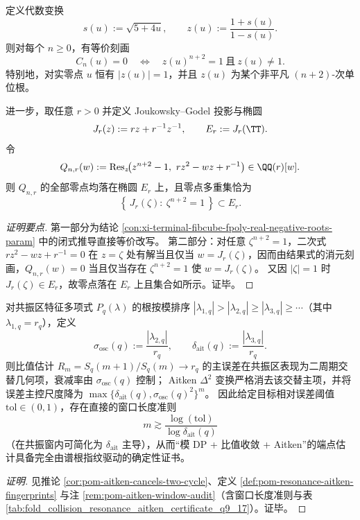 \begin{conclusion}\label{con:xi-terminal-fibcube-fpoly-circle-lift-jg-transport}
定义代数变换
\[
s(u):=\sqrt{5+4u},\qquad
z(u):=\frac{1+s(u)}{1-s(u)}.
\]
则对每个 \(n\ge 0\)，有等价刻画
\[
C_n(u)=0
\quad\Longleftrightarrow\quad
z(u)^{n+2}=1\ \text{且}\ z(u)\neq 1.
\]
特别地，对实零点 \(u\) 恒有 \(|z(u)|=1\)，并且 \(z(u)\) 为某个非平凡 \((n+2)\)-次单位根。
\par
进一步，取任意 \(r>0\) 并定义 Joukowsky--Godel 投影与椭圆
\[
J_r(z):=rz+r^{-1}z^{-1},\qquad E_r:=J_r(\TT).
\]
令
\[
Q_{n,r}(w):=\operatorname{Res}_z\!\bigl(z^{n+2}-1,\ r z^2-wz+r^{-1}\bigr)\in\QQ(r)[w].
\]
则 \(Q_{n,r}\) 的全部零点均落在椭圆 \(E_r\) 上，且零点多重集恰为
\[
\left\{\,J_r(\zeta):\ \zeta^{n+2}=1\,\right\}\subset E_r.
\]
\end{conclusion}
\begin{proof}[证明要点]
第一部分为结论 \ref{con:xi-terminal-fibcube-fpoly-real-negative-roots-param} 中的闭式推导直接等价改写。
第二部分：对任意 \(\zeta^{n+2}=1\)，二次式 \(r z^2-wz+r^{-1}=0\) 在 \(z=\zeta\) 处有解当且仅当 \(w=J_r(\zeta)\)，因而由结果式的消元刻画，\(Q_{n,r}(w)=0\) 当且仅当存在 \(\zeta^{n+2}=1\) 使 \(w=J_r(\zeta)\)。
又因 \(|\zeta|=1\) 时 \(J_r(\zeta)\in E_r\)，故零点落在 \(E_r\) 上且集合如所示。证毕。
\end{proof}

\begin{conclusion}\label{con:xi-terminal-resonance-aitken-certificate-window-law}
对共振区特征多项式 \(P_q(\lambda)\) 的根按模排序 \( |\lambda_{1,q}|>|\lambda_{2,q}|\ge|\lambda_{3,q}|\ge\cdots \)（其中 \(\lambda_{1,q}=r_q\)），定义
\[
\sigma_{\mathrm{osc}}(q):=\frac{|\lambda_{2,q}|}{r_q},\qquad
\delta_{\mathrm{ait}}(q):=\frac{|\lambda_{3,q}|}{r_q}.
\]
则比值估计
\(
R_m=S_q(m+1)/S_q(m)\to r_q
\)
的主误差在共振区表现为二周期交替几何项，衰减率由 \(\sigma_{\mathrm{osc}}(q)\) 控制；
Aitken \(\Delta^2\) 变换严格消去该交替主项，并将误差主控尺度降为
\(
\max\{\delta_{\mathrm{ait}}(q),\sigma_{\mathrm{osc}}(q)^2\}^m
\)。
因此给定目标相对误差阈值 \(\mathrm{tol}\in(0,1)\)，存在直接的窗口长度准则
\[
m\gtrsim \frac{\log(\mathrm{tol})}{\log \delta_{\mathrm{ait}}(q)}
\]
（在共振窗内可简化为 \(\delta_{\mathrm{ait}}\) 主导），从而“模 DP + 比值收敛 + Aitken”的端点估计具备完全由谱根指纹驱动的确定性证书。
\end{conclusion}
\begin{proof}[证明]
见推论 \ref{cor:pom-aitken-cancels-two-cycle}、定义 \ref{def:pom-resonance-aitken-fingerprints} 与注 \ref{rem:pom-aitken-window-audit}（含窗口长度准则与表 \ref{tab:fold_collision_resonance_aitken_certificate_q9_17}）。证毕。
\end{proof}

